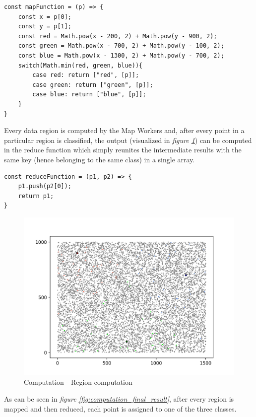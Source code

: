 \begin{lstlisting}
const mapFunction = (p) => {
    const x = p[0];
    const y = p[1];
    const red = Math.pow(x - 200, 2) + Math.pow(y - 900, 2);
    const green = Math.pow(x - 700, 2) + Math.pow(y - 100, 2);
    const blue = Math.pow(x - 1300, 2) + Math.pow(y - 700, 2);
    switch(Math.min(red, green, blue)){
        case red: return ["red", [p]];
        case green: return ["green", [p]];
        case blue: return ["blue", [p]];
    }
}
\end{lstlisting}

Every data region is computed by the Map Workers and, after every point in a particular region is classified, the output (visualized in \textit{figure \ref{fig:computation_region_computation}}) can be computed in the reduce function which simply reunites the intermediate results with the same key (hence belonging to the same class) in a single array.

\begin{lstlisting}
const reduceFunction = (p1, p2) => {
    p1.push(p2[0]);
    return p1;
}
\end{lstlisting}

\begin{figure}[!ht]
    \centering
    \includegraphics[width=\linewidth]{document/chapters/chapter_7/images/computation_region_computation.png}
    \caption{Computation - Region computation}
    \label{fig:computation_region_computation}
\end{figure}

As can be seen in \textit{figure \ref{fig:computation_final_result}}, after every region is mapped and then reduced, each point is assigned to one of the three classes.

